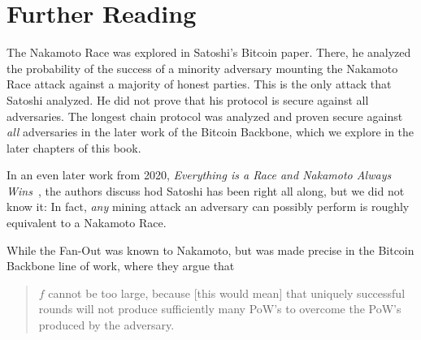 \begin{problems}


%
\end{problems}

\section*{Further Reading}

The Nakamoto Race was explored in Satoshi's Bitcoin paper. There, he analyzed the probability of
the success of a minority adversary mounting the Nakamoto Race attack against a majority of honest
parties. This is the only attack that Satoshi analyzed. He did not prove that his protocol is secure
against all adversaries. The longest chain protocol was analyzed and proven secure against \emph{all}
adversaries in the later work of the Bitcoin Backbone, which we explore in the later chapters of this
book.

In an even later work from 2020,
\emph{Everything is a Race and Nakamoto Always Wins~\cite{nakamoto-wins}},
the authors discuss hod Satoshi has been right all along, but we did not know it:
In fact, \emph{any} mining attack an adversary can possibly perform is roughly equivalent
to a Nakamoto Race.

While the Fan-Out was known to Nakamoto, but was made precise in the Bitcoin Backbone line of
work, where they argue that

\begin{quote}
$f$ cannot be too large, because [this would mean] that uniquely
successful rounds will not produce sufficiently many PoW's to overcome the PoW's
produced by the adversary.
\end{quote}
